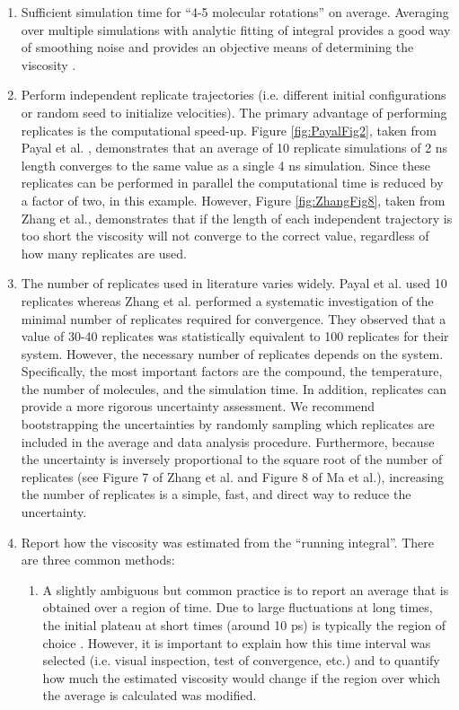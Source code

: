 \documentclass[9pt]{livecoms}
\begin{document}
\begin{enumerate}
	\item Sufficient simulation time for “4-5 molecular rotations” on average. Averaging over multiple simulations with analytic fitting of integral provides a good way of smoothing noise and provides an objective means of determining the viscosity \cite{Zhang2015}.
	\item Perform independent replicate trajectories (i.e. different initial configurations or random seed to initialize velocities). The primary advantage of performing replicates is the computational speed-up. Figure \ref{fig:PayalFig2}, taken from Payal et al. \cite{Payal2012}, demonstrates that an average of 10 replicate simulations of 2 ns length converges to the same value as a single 4 ns simulation. Since these replicates can be performed in parallel the computational time is reduced by a factor of two, in this example. However, Figure \ref{fig:ZhangFig8}, taken from Zhang et al., demonstrates that if the length of each independent trajectory is too short the viscosity will not converge to the correct value, regardless of how many replicates are used. 
	\item The number of replicates used in literature varies widely. Payal et al. used 10 replicates whereas Zhang et al. performed a systematic investigation of the minimal number of replicates required for convergence. They observed that a value of 30-40 replicates was statistically equivalent to 100 replicates for their system. However, the necessary number of replicates depends on the system. Specifically, the most important factors are the compound, the temperature, the number of molecules, and the simulation time.  In addition, replicates can provide a more rigorous uncertainty assessment. We recommend bootstrapping the uncertainties by randomly sampling which replicates are included in the average and data analysis procedure. Furthermore, because the uncertainty is inversely proportional to the square root of the number of replicates (see Figure 7 of Zhang et al. and Figure 8 of Ma et al.), increasing the number of replicates is a simple, fast, and direct way to reduce the uncertainty.
	\item Report how the viscosity was estimated from the ``running integral''. There are three common methods:
	\begin{enumerate}
		\item A slightly ambiguous but common practice is to report an average that is obtained over a region of time. Due to large fluctuations at long times, the initial plateau at short times (around 10 ps) is typically the region of choice \cite{Fanourgakis2012,Chen2009}. However, it is important to explain how this time interval was selected (i.e. visual inspection, test of convergence, etc.) and to quantify how much the estimated viscosity would change if the region over which the average is calculated was modified.

\end{enumerate}
\end{enumerate}
\end{document}

